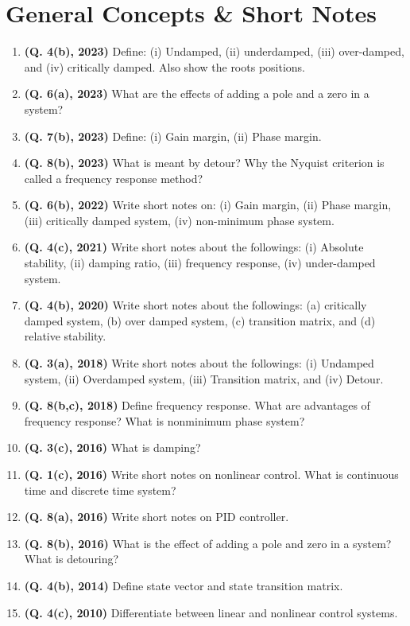 \documentclass[12pt, a4paper]{article}
\begin{document}
	\section{General Concepts \& Short Notes}
	\begin{enumerate}
		\item \textbf{(Q. 4(b), 2023)} Define: (i) Undamped, (ii) underdamped, (iii) over-damped, and (iv) critically damped. Also show the roots positions.
		\item \textbf{(Q. 6(a), 2023)} What are the effects of adding a pole and a zero in a system?
		\item \textbf{(Q. 7(b), 2023)} Define: (i) Gain margin, (ii) Phase margin.
		\item \textbf{(Q. 8(b), 2023)} What is meant by detour? Why the Nyquist criterion is called a frequency response method?
		\item \textbf{(Q. 6(b), 2022)} Write short notes on: (i) Gain margin, (ii) Phase margin, (iii) critically damped system, (iv) non-minimum phase system.
		\item \textbf{(Q. 4(c), 2021)} Write short notes about the followings: (i) Absolute stability, (ii) damping ratio, (iii) frequency response, (iv) under-damped system.
		\item \textbf{(Q. 4(b), 2020)} Write short notes about the followings: (a) critically damped system, (b) over damped system, (c) transition matrix, and (d) relative stability.
		\item \textbf{(Q. 3(a), 2018)} Write short notes about the followings: (i) Undamped system, (ii) Overdamped system, (iii) Transition matrix, and (iv) Detour.
		\item \textbf{(Q. 8(b,c), 2018)} Define frequency response. What are advantages of frequency response? What is nonminimum phase system?
		\item \textbf{(Q. 3(c), 2016)} What is damping?
		\item \textbf{(Q. 1(c), 2016)} Write short notes on nonlinear control. What is continuous time and discrete time system?
		\item \textbf{(Q. 8(a), 2016)} Write short notes on PID controller.
		\item \textbf{(Q. 8(b), 2016)} What is the effect of adding a pole and zero in a system? What is detouring?
		\item \textbf{(Q. 4(b), 2014)} Define state vector and state transition matrix.
		\item \textbf{(Q. 4(c), 2010)} Differentiate between linear and nonlinear control systems.
	\end{enumerate}
	
	
\end{document}
